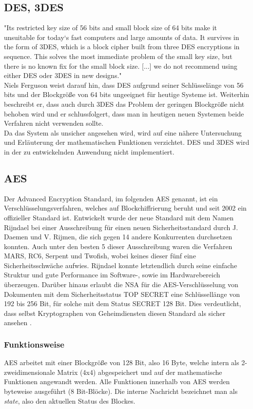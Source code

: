 \documentclass[10pt, a4paper,headsepline]{scrreprt}
\begin{document}
\subsection{DES, 3DES}
"Its restricted key size of 56 bits and small block size of 64 bits make it unsuitable for today`s fast computers and large amounts of data. It survives in the form of 3DES, which is a block cipher built from three DES encryptions in sequence. This solves the most immediate problem of the small key size, but there is no known fix for the small block size. [...] we do not recommend using either DES oder 3DES in new designs." \citep[S. 51]{book:practical-crypto} \\
Niels Ferguson weist darauf hin, dass DES aufgrund seiner Schlüsselänge von 56 bits und der Blockgröße von 64 bits ungeeignet für heutige Systeme ist. Weiterhin beschreibt er, dass auch durch 3DES das Problem der geringen Blockgröße nicht behoben wird und er schlussfolgert, dass man in heutigen neuen Systemen beide Verfahren nicht verwenden sollte. \\
Da das System als unsicher angesehen wird, wird auf eine nähere Untersuchung und Erläuterung der mathematischen Funktionen verzichtet. DES und 3DES wird in der zu entwickelnden Anwendung nicht implementiert.

\subsection{AES}
Der Advanced Encryption Standard, im folgenden AES genannt, ist ein Verschlüsselungsverfahren, welches auf Blockchiffrierung beruht und seit 2002 ein offizieller Standard ist. Entwickelt wurde der neue Standard mit dem Namen Rijndael bei einer Ausschreibung für einen neuen Sicherheitsstandard durch J. Daemen und V. Rijmen, die sich gegen 14 andere Konkurrenten durchsetzen konnten. Auch unter den besten 5 dieser Ausschreibung waren die Verfahren MARS, RC6, Serpent und Twofish, wobei keines dieser fünf eine Sicherheitsschwäche aufwies. Rijndael konnte letztendlich durch seine einfache Struktur und gute Performance im Software-, sowie im Hardwarebereich überzeugen. \citep[S. 343f]{book:it-sicherheit}
Darüber hinaus erlaubt die NSA für die AES-Verschlüsselung von Dokumenten mit dem Sicherheitsstatus TOP SECRET eine Schlüssellänge von 192 bis 256 Bit, für solche mit dem Status SECRET 128 Bit. Dies verdeutlicht, dass selbst Kryptographen von Geheimdiensten diesen Standard als sicher ansehen \citep[S. 89]{book:understanding-crypto}.


\subsubsection{Funktionsweise}
AES arbeitet mit einer Blockgröße von 128 Bit, also 16 Byte, welche intern als 2-zweidimensionale Matrix (4x4) abgespeichert und auf der mathematische Funktionen angewandt werden.
Alle Funktionen innerhalb von AES werden byteweise ausgeführt (8 Bit-Blöcke).  Die interne Nachricht bezeichnet man als \textit{state}, also den aktuellen Status des Blockes. \\
\end{document}
